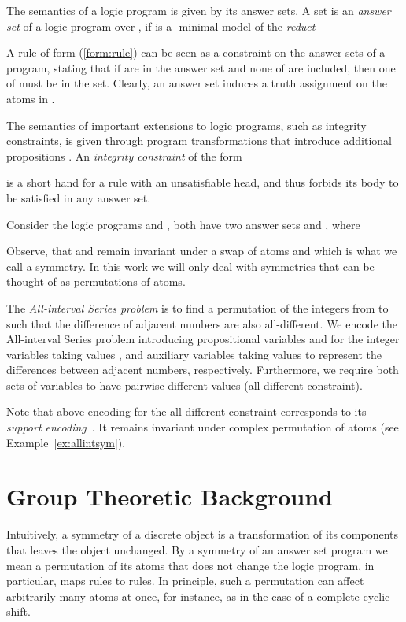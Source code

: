 \documentclass[envcountsame]{llncs}
\begin{document}
The semantics of a logic program is given by its answer sets. A set  is an \emph{answer set} of a logic program  over , if  is a -minimal model of the \emph{reduct} \cite{gellif91a}

A rule of form (\ref{form:rule}) can be seen as a constraint on the answer sets of a program, stating that if  are in the answer set and none of  are included, then one of  must be in the set. Clearly, an answer set induces a truth assignment on the atoms in .

The semantics of important extensions to logic programs, such as integrity constraints, is given through program transformations that introduce additional propositions \cite{siniso02a}.
An \emph{integrity constraint} of the form

is a short hand for a rule with an unsatisfiable head, and thus forbids its body to be satisfied in any answer set.

\begin{example} Consider the logic programs  and , both have two answer sets  and , where

Observe, that  and  remain invariant under a swap of atoms  and  which is what we call a symmetry. In this work we will only deal with symmetries that can be thought of as permutations of atoms.
\end{example}

\begin{example} \label{ex:allint}
The \emph{All-interval Series problem} is to find a permutation of the  integers from  to  such that the difference of adjacent numbers are also all-different. We encode the All-interval Series problem introducing propositional variables  and  for the  integer variables taking values , and  auxiliary variables taking values  to represent the differences between adjacent numbers, respectively. Furthermore, we require both sets of variables to have pairwise different values (all-different constraint).

Note that above encoding for the all-different constraint corresponds to its \emph{support encoding}~\cite{drwa10a}. It remains invariant under complex permutation of atoms (see Example~\ref{ex:allintsym}).
\end{example}

\section{Group Theoretic Background}
Intuitively, a symmetry of a discrete object is a transformation of its components that leaves the object unchanged. By a symmetry of an answer set program we mean a permutation of its atoms that does not change the logic program, in particular, maps rules to rules. In principle, such a permutation can affect arbitrarily many atoms at once, for instance, as in the case of a complete cyclic shift.
\end{document}
